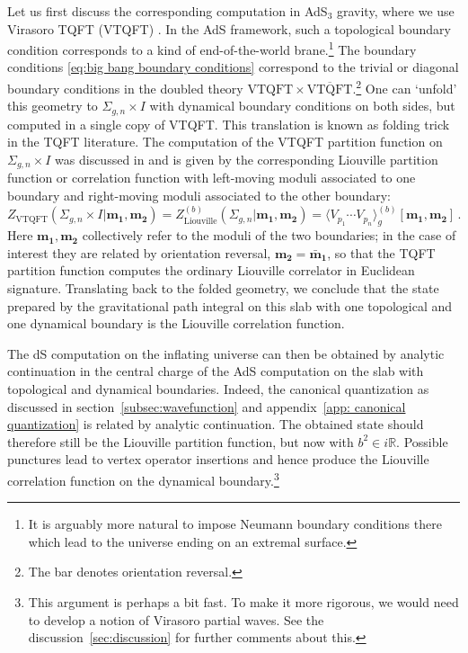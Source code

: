 \documentclass[12pt,a4paper]{article}
\newcommand\RR{\mathbb{R}}
\begin{document}
Let us first discuss the corresponding computation in AdS$_3$ gravity, where we use Virasoro TQFT (VTQFT) \cite{Collier:2023fwi, Collier:2024mgv}. In the AdS framework, such a topological boundary condition corresponds to a kind of end-of-the-world brane.\footnote{It is arguably more natural to impose Neumann boundary conditions there which lead to the universe ending on an extremal surface. } The boundary conditions \eqref{eq:big bang boundary conditions} correspond to the trivial or diagonal boundary conditions in the doubled theory $\text{VTQFT} \times \overline{\text{VTQFT}}$.\footnote{The bar denotes orientation reversal.} One can `unfold' this geometry to $\Sigma_{g,n} \times I$ with dynamical boundary conditions on both sides, but computed in a single copy of VTQFT. This translation is known as folding trick in the TQFT literature. The computation of the VTQFT partition function on $\Sigma_{g,n} \times I$ was discussed in \cite{Collier:2023fwi} and is given by the corresponding Liouville partition function or correlation function with left-moving moduli associated to one boundary and right-moving moduli associated to the other boundary:
\begin{equation}
    Z_{\text{VTQFT}}(\Sigma_{g,n}\times I|\boldsymbol{m_1},\boldsymbol{m_2}) = Z_{\text{Liouville}}^{(b)}(\Sigma_{g,n}|\boldsymbol{m_1},\boldsymbol{m_2}) = \langle V_{p_1}\cdots V_{p_n}\rangle_g^{(b)}[\boldsymbol{m_1},\boldsymbol{m_2}]\, .
\end{equation}
Here $\boldsymbol{m_1},\boldsymbol{m_2}$ collectively refer to the moduli of the two boundaries; in the case of interest they are related by orientation reversal, $\boldsymbol{m_2} = \boldsymbol{\bar m_1}$, so that the TQFT partition function computes the ordinary Liouville correlator in Euclidean signature.
Translating back to the folded geometry, we conclude that the state prepared by the gravitational path integral on this slab with one topological and one dynamical boundary is the Liouville correlation function. 

The dS computation on the inflating universe can then be obtained by analytic continuation in the central charge of the AdS computation on the slab with topological and dynamical boundaries. Indeed, the canonical quantization as discussed in section~\ref{subsec:wavefunction} and appendix~\ref{app: canonical quantization} is related by analytic continuation. The obtained state should therefore still be the Liouville partition function, but now with $b^2 \in i \RR$. Possible punctures lead to vertex operator insertions and hence produce the Liouville correlation function on the dynamical boundary.\footnote{This argument is perhaps a bit fast. To make it more rigorous, we would need to develop a notion of Virasoro partial waves. See the discussion~\ref{sec:discussion} for further comments about this.}
\end{document}
